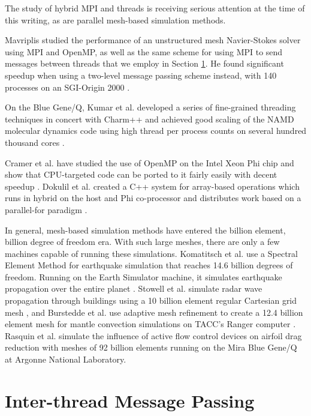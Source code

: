 \documentclass[final,1p,times]{elsarticle}
\begin{document}
The study of hybrid MPI and threads is receiving serious attention
at the time of this writing, as are parallel mesh-based simulation
methods.

Mavriplis studied the performance of an unstructured mesh
Navier-Stokes solver using MPI and OpenMP, as well as the same
scheme for using MPI to send messages between threads that
we employ in Section \ref{sec:p2p}.
He found significant speedup when using a two-level message
passing scheme instead, with 140 processes on an SGI-Origin 2000
\cite{mavriplis2002parallel}.

On the Blue Gene/Q, Kumar et al. developed a series of fine-grained
threading techniques in concert with Charm++ and achieved good
scaling of the NAMD molecular dynamics code using high thread
per process counts on several hundred thousand cores
\cite{kumar2013acceleration}.

Cramer et al. have studied the use of OpenMP on the Intel Xeon Phi
chip and show that CPU-targeted code can be ported to it fairly
easily with decent speedup \cite{cramer2012openmp}.
Dokulil et al. created a C++ system for array-based operations
which runs in hybrid on the host and Phi co-processor and distributes
work based on a parallel-for paradigm \cite{Dokulil20132508}.

In general, mesh-based simulation methods have entered the billion element,
billion degree of freedom era.
With such large meshes, there are only a few machines capable of running
these simulations.
Komatitsch et al. use a Spectral Element Method for earthquake simulation
that reaches 14.6 billion degrees of freedom.
Running on the Earth Simulator machine, it simulates earthquake propagation
over the entire planet \cite{komatitsch200314}.
Stowell et al. simulate radar wave propagation through buildings using
a 10 billion element regular Cartesian grid mesh
\cite{stowell2008investigation},
and Burstedde et al. use adaptive mesh refinement to create a
12.4 billion element mesh for mantle convection simulations
on TACC's Ranger computer \cite{burstedde2008scalable}.
Rasquin et al. \cite{rasquin2014scalable} simulate the influence of active flow control
devices on airfoil drag reduction with meshes of 92 billion elements
running on the Mira Blue Gene/Q at Argonne National Laboratory.

\section{Inter-thread Message Passing}
\label{sec:p2p}
\end{document}
